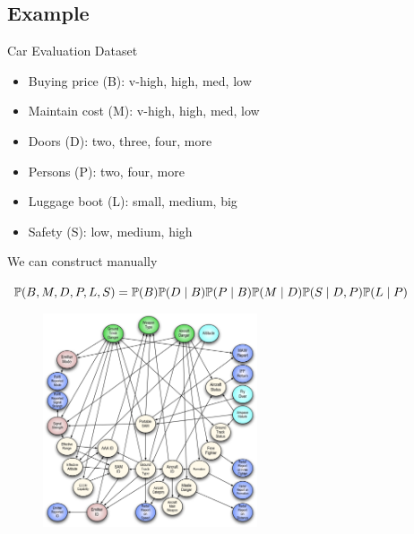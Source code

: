 \subsection{Example}

\begin{frame}
	\begin{block}{Car Evaluation Dataset}
		\begin{itemize}
			\item Buying price (B): v-high, high, med, low
			\item Maintain cost (M): v-high, high, med, low
			\item Doors (D): two, three, four, more
			\item Persons (P): two, four, more
			\item Luggage boot (L): small, medium, big
			\item Safety (S): low, medium, high
		\end{itemize}
	\end{block}
\end{frame}
	
\begin{frame}
	We can construct manually
	\begin{figure}
		\centering
		
	\end{figure}
	\begin{block}{}
		$\P( B , M , D , P , L , S ) = \P( B ) \P( D \mid B ) \P( P \mid B ) \P( M \mid D ) \P( S \mid D , P ) \P( L \mid P )$
	\end{block}
\end{frame}
	
\begin{frame}[fragile]
	\begin{figure}
		\centering
		\includegraphics[height=17em]{images/complexbn}
	\end{figure}
\end{frame}